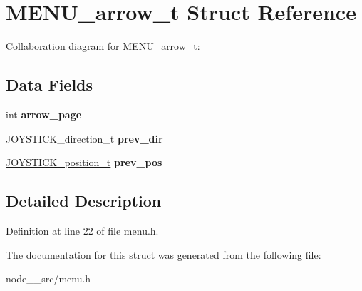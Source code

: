 \hypertarget{structMENU__arrow__t}{}\section{M\+E\+N\+U\+\_\+arrow\+\_\+t Struct Reference}
\label{structMENU__arrow__t}


Collaboration diagram for M\+E\+N\+U\+\_\+arrow\+\_\+t\+:
\subsection*{Data Fields}
\begin{DoxyCompactItemize}
\item 
int {\bfseries arrow\+\_\+page}\hypertarget{structMENU__arrow__t_a24299e620d6f9bc8c58c2a4c012bea5a}{}\label{structMENU__arrow__t_a24299e620d6f9bc8c58c2a4c012bea5a}

\item 
J\+O\+Y\+S\+T\+I\+C\+K\+\_\+direction\+\_\+t {\bfseries prev\+\_\+dir}\hypertarget{structMENU__arrow__t_a718e4d73256c1c0f2c6f346c311d35b5}{}\label{structMENU__arrow__t_a718e4d73256c1c0f2c6f346c311d35b5}

\item 
\hyperlink{structJOYSTICK__position__t}{J\+O\+Y\+S\+T\+I\+C\+K\+\_\+position\+\_\+t} {\bfseries prev\+\_\+pos}\hypertarget{structMENU__arrow__t_a16690b9f75d3dba63f9d436f71fd6a13}{}\label{structMENU__arrow__t_a16690b9f75d3dba63f9d436f71fd6a13}

\end{DoxyCompactItemize}


\subsection{Detailed Description}


Definition at line 22 of file menu.\+h.



The documentation for this struct was generated from the following file\+:\begin{DoxyCompactItemize}
\item 
node\+\_\+\_\+src/menu.\+h\end{DoxyCompactItemize}
